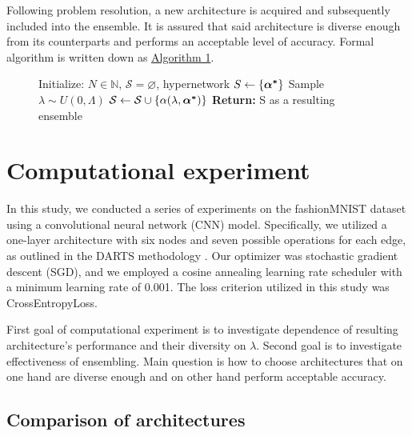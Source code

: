 \documentclass{article}
\begin{document}
Following problem resolution, a new architecture is acquired and subsequently included into the ensemble. It is assured that said architecture is diverse enough from its counterparts and performs an acceptable level of accuracy. Formal algorithm is written down as \hyperref[alg:1]{Algorithm 1}.
\begin{figure}[h]  
  \begin{minipage}{.6\linewidth}
    \begin{algorithm}[H]
    \caption{}\label{alg:1}
        \begin{algorithmic}
                \State Initialize: $N \in \mathbb{N}$, $\mathcal{S} = \varnothing$, hypernetwork
            \State $S \gets \{ \mbox{\boldmath{$\alpha^*$}} \}$ 
                \State Sample $\lambda \sim U(0, \Lambda)$
                \State $\mathcal{S} \gets \mathcal{S} \cup \{ \alpha(\lambda, \mbox{\boldmath{$\alpha^*$}}) \}$ 
            \EndFor
            \State \textbf{Return:} S as a resulting ensemble
        \end{algorithmic}
    \end{algorithm}
  \end{minipage}
\end{figure}

\section{Computational experiment}

In this study, we conducted a series of experiments on the fashionMNIST dataset \citep{xiao2017fashion} using a convolutional neural network (CNN) model.
Specifically, we utilized a one-layer architecture with six nodes and seven possible operations for each edge, as outlined in the DARTS methodology \cite{darts}.
Our optimizer was stochastic gradient descent (SGD), and we employed a cosine annealing learning rate scheduler with a minimum learning rate of 0.001. The loss criterion utilized in this study was CrossEntropyLoss.

First goal of computational experiment is to investigate dependence of resulting architecture's performance and their diversity on $\lambda$.
Second goal is to investigate effectiveness of ensembling.
Main question is how to choose architectures that on one hand are diverse enough and on other hand perform acceptable accuracy.

\subsection{Comparison of architectures}
\end{document}
